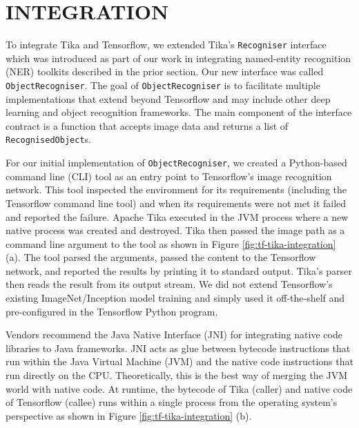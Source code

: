 
\section{INTEGRATION} \label{sec:integration}
To integrate Tika and Tensorflow, we extended Tika's \texttt{Recogniser} interface which was introduced as part of our work in integrating named-entity recognition (NER) toolkits described in the prior section. Our new interface was called \texttt{ObjectRecogniser}. The goal of \texttt{ObjectRecogniser} is to facilitate multiple implementations that extend beyond Tensorflow and may include other deep learning and object recognition frameworks. The main component of the interface contract is a function that accepts image data and returns a list of \texttt{RecognisedObject}s.

For our initial implementation of \texttt{ObjectRecogniser}, we created a Python-based command line (CLI) tool as an entry point to Tensorflow's image recognition network. This tool inspected the environment for its requirements (including the Tensorflow command line tool) and when its requirements were not met it failed and reported the failure. Apache Tika executed in the JVM process where a new native process was created and destroyed. Tika then passed the image path as a command line argument to the tool as shown in Figure \ref{fig:tf-tika-integration} (a). The tool parsed the arguments, passed the content to the Tensorflow network, and reported the results by printing it to standard output. Tika's parser then reads the result from its output stream. We did not extend Tensorflow's existing ImageNet/Inception model training and simply used it off-the-shelf and pre-configured in the Tensorflow Python program.

Vendors recommend the Java Native Interface (JNI) for integrating native code libraries to Java frameworks\cite{gordon1998essential}. JNI acts as glue between bytecode instructions that run within the Java Virtual Machine (JVM) and the native code instructions that run directly on the CPU. Theoretically, this is the best way of merging the JVM world with native code. At runtime, the bytecode of Tika (caller) and native code of Tensorflow (callee) runs within a single process from the operating system's perspective as shown in Figure \ref{fig:tf-tika-integration} (b).

